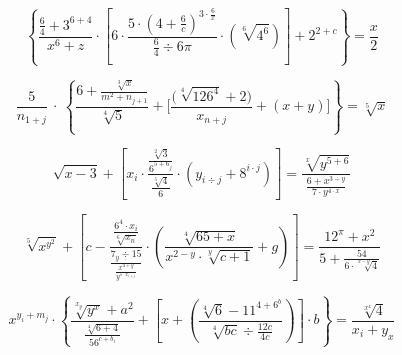 \documentclass[aspectratio=169]{beamer}
\begin{document}

\begin{frame}
\fontsize{60pt}{60pt}

$$
\left\{\frac{\frac{6}{4}+3^{6+4}}{x^6+z}\cdot \left[6\cdot \frac{5\cdot \left(4+\frac{6}{c}\right)^{3\cdot \frac{6}{x}}}{\frac{6}{4}\div 6\pi }\cdot \left(\sqrt[6]{4^6}\right)\right]+2^{2+c}\right\}=\frac{x}{2}
$$

\end{frame}


\begin{frame}
\fontsize{60pt}{60pt}

$$
\frac{5}{n_{1+j}}\:\cdot \:\left\{\frac{6+\frac{\sqrt[3]{x}}{m^2+n_{j+1}}}{\sqrt[4]{5}}+\Biggl[\frac{\bigl(\sqrt[4]{126^4}+2\bigr)}{x_{n+j}}+\left(x+y\right)\Biggr]\right\}=\sqrt[5]{x}
$$

\end{frame}


\begin{frame}
\fontsize{60pt}{60pt}

$$\sqrt{x-3}+\left[x_i \cdot \frac{\frac{\sqrt[2]{3}}{6^{5+6_j}}}{\frac{\sqrt[5]{4}}{6}} \cdot \left(y_{i \div j}+8^{i \cdot j} \right) \right] = \frac{\sqrt[x]{y^{5+6}}}{\frac{6+x^{3 \div y}}{7 \cdot y^{4 \cdot x}}} $$

\end{frame}


\begin{frame}
\fontsize{60pt}{60pt}

$$ \sqrt[5]{ x^{y^2}} + \left[ c - \frac{\frac{6^{4} \cdot x_{i}}{\sqrt[6]{x_{n}}}}{\frac{7_{y} \div 15}{\frac{x^{4+y}}{y^{5 \cdot x_{i+j}}}}}     \cdot     \left(  \frac{\sqrt[4]{65+x}}{x^{2-y} \cdot \sqrt[y]{c+1}} + g  \right)    \right]  = \frac{12^\pi + x^2}{5+ \frac{54}{6 \cdot \sqrt[x-y]{4}}}  $$

\end{frame}


\begin{frame}
\fontsize{55pt}{55pt}

$$ x^{y_i+m_j}\cdot\left\{{\frac{\sqrt[x_y]{y^x}+a^2}{\frac{\sqrt[4]{6+4}}{56^{c+b_i}}}}+\left[{x}+\left({\frac{\sqrt[4]{6}-11^{4+6^b}}{\sqrt[4]{bc}\div{\frac{12c}{4c}}}}\right)\right]\cdot{b} \right\}= \frac{\sqrt[x^4]{4}}{x_i+y_x} $$

\end{frame}
\end{document}
